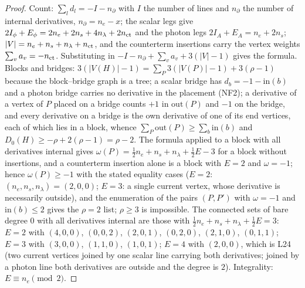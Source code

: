 \begin{proof}
Count: $\sum_ld_l=-I-n_\partial$ with $I$ the number of lines and $n_\partial$ the number of internal derivatives, $n_\partial=n_e-x$; the scalar legs give $2I_\phi+E_\phi=2n_e+2n_s+4n_\lambda+2n_{\rm ct}$ and the photon legs $2I_A+E_A=n_e+2n_s$; $|V|=n_e+n_s+n_\lambda+n_{\rm ct}$, and the counterterm insertions carry the vertex weights $\sum_va_v=-n_{\rm ct}$. Substituting in $-I-n_\partial+\sum_va_v+3(|V|-1)$ gives the formula. Blocks and bridges: $3(|V(H)|-1)=\sum_P3(|V(P)|-1)+3(\rho-1)$ because the block--bridge graph is a tree; a scalar bridge has $d_b=-1-\mathrm{in}(b)$ and a photon bridge carries no derivative in the placement (NF2); a derivative of a vertex of $P$ placed on a bridge counts $+1$ in $\mathrm{out}(P)$ and $-1$ on the bridge, and every derivative on a bridge is the own derivative of one of its end vertices, each of which lies in a block, whence $\sum_P\mathrm{out}(P)\ge\sum_b\mathrm{in}(b)$ and $D_0(H)\ge-\rho+2(\rho-1)=\rho-2$. The formula applied to a block with all derivatives internal gives $\omega(P)=\frac12n_e+n_s+n_\lambda+\frac12E-3$ for a block without insertions, and a counterterm insertion alone is a block with $E=2$ and $\omega=-1$; hence $\omega(P)\ge-1$ with the stated equality cases ($E=2$: $(n_e,n_s,n_\lambda)=(2,0,0)$; $E=3$: a single current vertex, whose derivative is necessarily outside), and the enumeration of the pairs $(P,P')$ with $\omega=-1$ and $\mathrm{in}(b)\le2$ gives the $\rho=2$ list; $\rho\ge3$ is impossible. The connected sets of bare degree $0$ with all derivatives internal are those with $\frac12n_e+n_s+n_\lambda+\frac12E=3$: $E=2$ with $(4,0,0)$, $(0,0,2)$, $(2,0,1)$, $(0,2,0)$, $(2,1,0)$, $(0,1,1)$; $E=3$ with $(3,0,0)$, $(1,1,0)$, $(1,0,1)$; $E=4$ with $(2,0,0)$, which is L24 (two current vertices joined by one scalar line carrying both derivatives; joined by a photon line both derivatives are outside and the degree is $2$). Integrality: $E\equiv n_e\pmod2$.
\end{proof}

